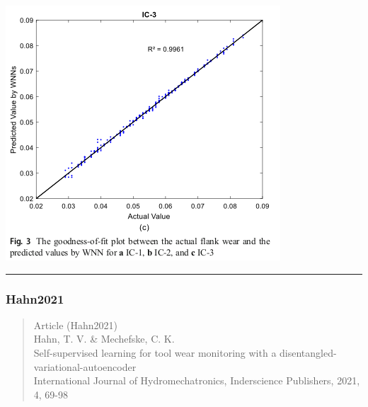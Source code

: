 \documentclass[
  letterpaper,
  DIV=11,
  numbers=noendperiod]{scrartcl}
\begin{document}
\begin{itemize}
  \includegraphics{img/2023-01-09-13-01-36.png}
\end{itemize}

\begin{center}\rule{0.5\linewidth}{0.5pt}\end{center}

\hypertarget{hahn2021}{%
\subsubsection{Hahn2021}\label{hahn2021}}

\begin{quote}
Article (Hahn2021)\\
Hahn, T. V. \& Mechefske, C. K.\\
Self-supervised learning for tool wear monitoring with a
disentangled-variational-autoencoder\\
International Journal of Hydromechatronics, Inderscience Publishers,
2021, 4, 69-98
\end{quote}
\end{document}
